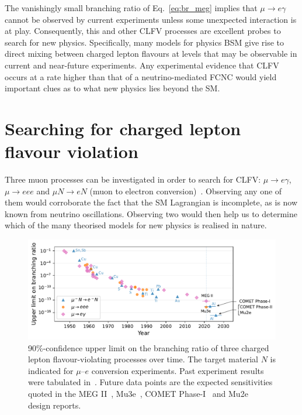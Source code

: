 The vanishingly small branching ratio of Eq.~\ref{eq:br_meg} implies that
$\mu\rightarrow e\gamma$ cannot be observed by current experiments unless some
unexpected interaction is at play. Consequently, this and other CLFV processes
are excellent probes to search for new physics. Specifically, many models for
physics BSM give rise to direct mixing between charged lepton flavours at levels
that may be observable in current and near-future experiments. Any experimental
evidence that CLFV occurs at a rate higher than that of a neutrino-mediated FCNC
would yield important clues as to what new physics lies beyond the SM.

\section{Searching for charged lepton flavour violation}\label{sec:clfv}

Three muon processes can be investigated in order to search for CLFV: ${\mu
\rightarrow e\gamma}$, ${\mu \rightarrow eee}$ and ${\mu N \rightarrow e N}$
(muon to electron conversion)~\cite{BERNSTEIN201327}. Observing any one of them
would corroborate the fact that the SM Lagrangian is incomplete, as is now known
from neutrino oscillations. Observing two would then help us to determine which
of the many theorised models for new physics is realised in nature. 


\begin{figure}
    \centering
    \includegraphics[width=\textwidth]{chapter1/clfv_upper_limit_v2.pdf}
    \caption{
        90\%-confidence upper limit on the branching ratio of three charged
        lepton flavour-violating processes over time. 
        The target material $N$ is indicated for $\mu$--$e$ conversion experiments.
        Past experiment results
        were tabulated in~\cite{BERNSTEIN201327}. Future data points are the
        expected sensitivities quoted in the MEG II~\cite{Baldini2018},
        Mu3e~\cite{ARNDT2021165679}, COMET
        Phase-I~\cite{the_comet_collaboration_comet_2020} and
        Mu2e~\cite{bartoszek2015mu2e} design reports.
    }
    \label{fig:clfv_upper_limit}
\end{figure}

